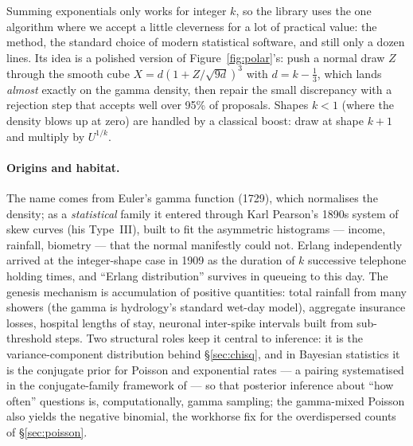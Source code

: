 \documentclass[11pt]{article}
\numberwithin{equation}{section}
\begin{document}
Summing exponentials only works for integer $k$, so the library uses the
one algorithm where we accept a little cleverness for a lot of practical
value: the \citet{marsaglia2000gamma} method, the standard choice of
modern statistical software, and still only a dozen lines.  Its idea is a
polished version of Figure~\ref{fig:polar}'s: push a normal draw $Z$
through the smooth cube $X=d(1+Z/\sqrt{9d})^3$ with $d=k-\tfrac13$, which
lands \emph{almost} exactly on the gamma density, then repair the small
discrepancy with a rejection step that accepts well over 95\% of
proposals.  Shapes $k<1$ (where the density blows up at zero) are handled
by a classical boost: draw at shape $k+1$ and multiply by $U^{1/k}$.

\paragraph{Origins and habitat.}
The name comes from Euler's gamma function (1729), which normalises the
density; as a \emph{statistical} family it entered through Karl Pearson's
1890s system of skew curves (his Type~III), built to fit the asymmetric
histograms — income, rainfall, biometry — that the normal manifestly
could not.  Erlang independently arrived at the integer-shape case in
1909 as the duration of $k$ successive telephone holding times, and
``Erlang distribution'' survives in queueing to this day.  The genesis
mechanism is accumulation of positive quantities: total rainfall from
many showers (the gamma is hydrology's standard wet-day model), aggregate
insurance losses, hospital lengths of stay, neuronal inter-spike
intervals built from sub-threshold steps.  Two structural roles keep it
central to inference: it is the variance-component distribution behind
\S\ref{sec:chisq}, and in Bayesian statistics it is the conjugate prior
for Poisson and exponential rates --- a pairing systematised in the
conjugate-family framework of \citet{raiffa1961} --- so that posterior
inference about ``how often'' questions is, computationally, gamma
sampling; the gamma-mixed Poisson also yields the negative binomial, the
workhorse fix for the overdispersed counts of \S\ref{sec:poisson}.
\end{document}
